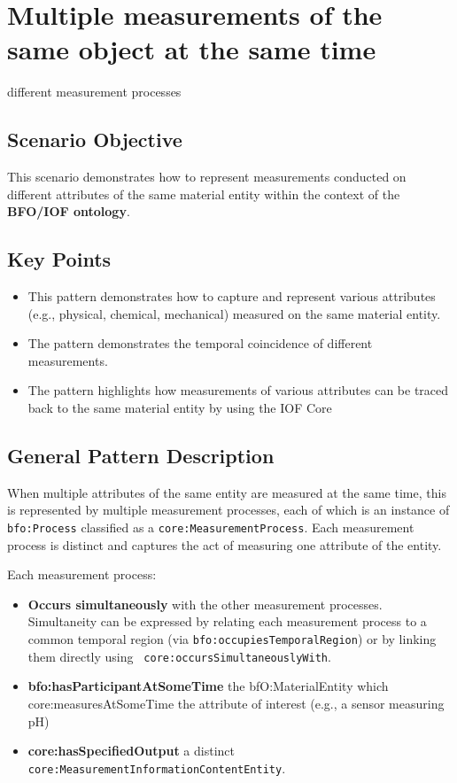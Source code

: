 

\section{Multiple measurements of the same object at the same time}
different measurement processes 

\subsection*{Scenario Objective}

This scenario demonstrates how to represent measurements conducted on different attributes of the same material entity within the context of the \textbf{BFO/IOF ontology}.

\subsection*{Key Points}
\begin{itemize}
    \item This pattern demonstrates how to capture and represent various attributes (e.g., physical, chemical, mechanical) measured on the same material entity.
    \item The pattern demonstrates the temporal coincidence of different measurements.
     \item The pattern highlights how measurements of various attributes can be traced back to the same material entity by using the IOF Core
\end{itemize}


\subsection*{General Pattern Description}

When multiple attributes of the same entity are measured at the same time, this is represented by multiple measurement processes, each of which is an instance of \texttt{bfo:Process} classified as a \texttt{core:MeasurementProcess}. Each measurement process is distinct and captures the act of measuring one attribute of the entity.

Each measurement process:

\begin{itemize}
    \item \textbf{Occurs simultaneously} with the other measurement processes. Simultaneity can be expressed by relating each measurement process to a common temporal region (via \texttt{bfo:occupiesTemporalRegion}) or by linking them directly using \texttt{ core:occursSimultaneouslyWith}.
    \item \textbf{bfo:hasParticipantAtSomeTime} the bfO:MaterialEntity which core:measuresAtSomeTime the attribute of interest (e.g., a sensor measuring pH)
    \item \textbf{core:hasSpecifiedOutput} a distinct \texttt{core:MeasurementInformationContentEntity}.
\end{itemize}

